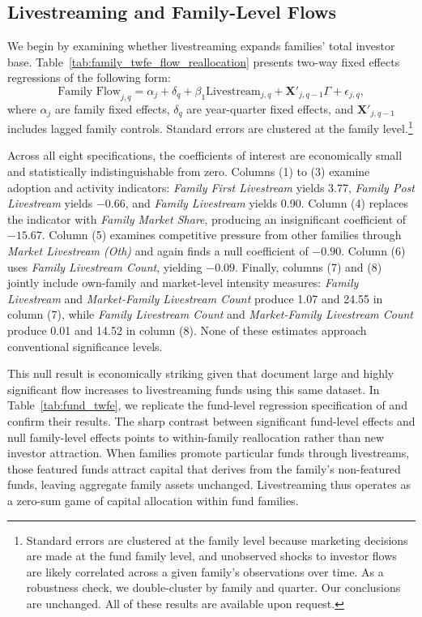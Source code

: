 \documentclass[12pt]{article}
\begin{document}
\subsection{Livestreaming and Family-Level Flows}\label{subsec:family_flows}

We begin by examining whether livestreaming expands families' total investor base. Table~\ref{tab:family_twfe_flow_reallocation} presents two-way fixed effects regressions of the following form:
\begin{equation}
    \label{eq:family_flow_twfe}
    \text{Family Flow}_{j,q} = \alpha_j + \delta_q + \beta_1 \text{Livestream}_{j,q} + \mathbf{X}'_{j,q-1} \Gamma + \epsilon_{j,q},
\end{equation}
where $\alpha_j$ are family fixed effects, $\delta_q$ are year-quarter fixed effects, and $\mathbf{X}'_{j,q-1}$ includes lagged family controls. Standard errors are clustered at the family level.\footnote{Standard errors are clustered at the family level because marketing decisions are made at the fund family level, and unobserved shocks to investor flows are likely correlated across a given family's observations over time. As a robustness check, we double-cluster by family and quarter. Our conclusions are unchanged. All of these results are available upon request.}

Across all eight specifications, the coefficients of interest are economically small and statistically indistinguishable from zero. Columns (1) to (3) examine adoption and activity indicators: \textit{Family First Livestream} yields 3.77, \textit{Family Post Livestream} yields $-0.66$, and \textit{Family Livestream} yields 0.90. Column (4) replaces the indicator with \textit{Family Market Share}, producing an insignificant coefficient of $-15.67$. Column (5) examines competitive pressure from other families through \textit{Market Livestream (Oth)} and again finds a null coefficient of $-0.90$. Column (6) uses \textit{Family Livestream Count}, yielding $-0.09$. Finally, columns (7) and (8) jointly include own-family and market-level intensity measures: \textit{Family Livestream} and \textit{Market-Family Livestream Count} produce 1.07 and 24.55 in column (7), while \textit{Family Livestream Count} and \textit{Market-Family Livestream Count} produce 0.01 and 14.52 in column (8). None of these estimates approach conventional significance levels.

This null result is economically striking given that \citet{dehaan2025social} document large and highly significant flow increases to livestreaming funds using this same dataset. In Table~\ref{tab:fund_twfe}, we replicate the fund-level regression specification of \citet{dehaan2025social} and confirm their results. The sharp contrast between significant fund-level effects and null family-level effects points to within-family reallocation rather than new investor attraction. When families promote particular funds through livestreams, those featured funds attract capital that derives from the family's non-featured funds, leaving aggregate family assets unchanged. Livestreaming thus operates as a zero-sum game of capital allocation within fund families.
\end{document}
